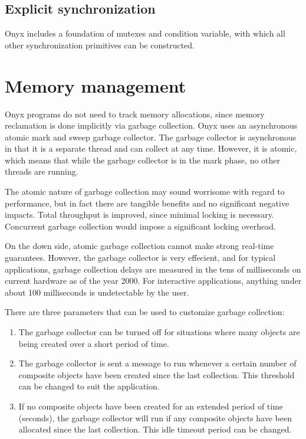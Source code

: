 \subsection{Explicit synchronization}

Onyx includes a foundation of mutexes and condition variable, with which all
other synchronization primitives can be constructed.

\section{Memory management}
Onyx programs do not need to track memory allocations, since memory reclamation
is done implicitly via garbage collection.  Onyx uses an asynchronous atomic
mark and sweep garbage collector.  The garbage collector is asynchronous in that
it is a separate thread and can collect at any time.  However, it is atomic,
which means that while the garbage collector is in the mark phase, no other
threads are running.

The atomic nature of garbage collection may sound worrisome with regard to
performance, but in fact there are tangible benefits and no significant negative
impacts.  Total throughput is improved, since minimal locking is necessary.
Concurrent garbage collection would impose a significant locking overhead.

On the down side, atomic garbage collection cannot make strong real-time
guarantees.  However, the garbage collector is very effecient, and for typical
applications, garbage collection delays are measured in the tens of milliseconds
on current hardware as of the year 2000.  For interactive applications, anything
under about 100 milliseconds is undetectable by the user.

There are three parameters that can be used to customize garbage collection:
\begin{enumerate}
\item{The garbage collector can be turned off for situations where many objects
are being created over a short period of time.}
\item{The garbage collector is sent a message to run whenever a certain number
of composite objects have been created since the last collection.  This
threshold can be changed to suit the application.}
\item{If no composite objects have been created for an extended period of time
(seconds), the garbage collector will run if any composite objects have been
allocated since the last collection.  This idle timeout period can be changed.}
\end{enumerate}

